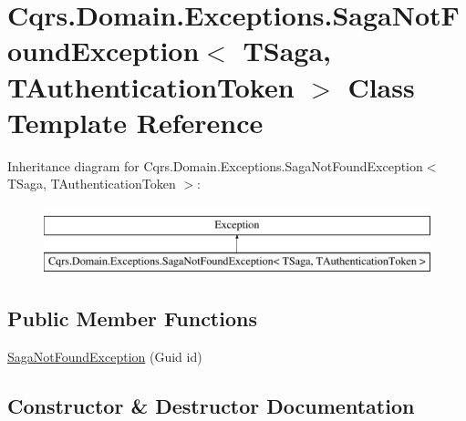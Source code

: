 \hypertarget{classCqrs_1_1Domain_1_1Exceptions_1_1SagaNotFoundException}{}\section{Cqrs.\+Domain.\+Exceptions.\+Saga\+Not\+Found\+Exception$<$ T\+Saga, T\+Authentication\+Token $>$ Class Template Reference}
\label{classCqrs_1_1Domain_1_1Exceptions_1_1SagaNotFoundException}
Inheritance diagram for Cqrs.\+Domain.\+Exceptions.\+Saga\+Not\+Found\+Exception$<$ T\+Saga, T\+Authentication\+Token $>$\+:\begin{figure}[H]
\begin{center}
\leavevmode
\includegraphics[height=2.000000cm]{classCqrs_1_1Domain_1_1Exceptions_1_1SagaNotFoundException}
\end{center}
\end{figure}
\subsection*{Public Member Functions}
\begin{DoxyCompactItemize}
\item 
\hyperlink{classCqrs_1_1Domain_1_1Exceptions_1_1SagaNotFoundException_a329725b9034ccf3167b667383fb8718a}{Saga\+Not\+Found\+Exception} (Guid id)
\end{DoxyCompactItemize}


\subsection{Constructor \& Destructor Documentation}
\mbox{\label{classCqrs_1_1Domain_1_1Exceptions_1_1SagaNotFoundException_a329725b9034ccf3167b667383fb8718a}} 
